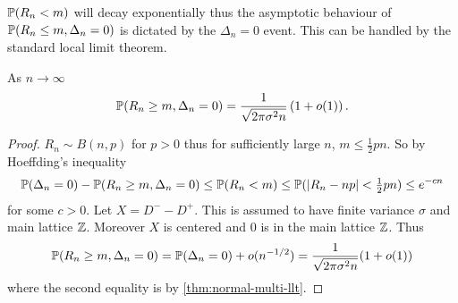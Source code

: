 $\P(R_n < m)$ will decay exponentially thus the asymptotic behaviour of $\P(R_n \leq m, \Delta_n = 0)$ is dictated by the $\Delta_n = 0$ event. This can be handled by the standard local limit theorem.
\begin{lemma}
    \label{lem:normal-llt}
    As $n \to \infty$
    \begin{equation*}
        \P(R_n \geq m, \Delta_n = 0) = \frac{1}{\sqrt{2 \pi \sigma^2 n}} \left( 1 + \littleo(1) \right).
    \end{equation*}
\end{lemma}
\begin{proof}
    $R_n \sim B(n, p)$ for $p > 0$ thus for sufficiently large $n$, $m \leq \frac{1}{2} pn$. So by Hoeffding's inequality
    \begin{equation*}
        \P(\Delta_n = 0) - \P(R_n \geq m, \Delta_n = 0) \leq \P(R_n < m) \leq \P(\abs{R_n - np} < \tfrac{1}{2}pn) \leq e^{-cn}
    \end{equation*}
    for some $c > 0$.  Let $X = D^- - D^+$. This is assumed to have finite variance $\sigma$ and main lattice $\Z$. Moreover $X$ is centered and $0$ is in the main lattice $\Z$. Thus
    \begin{equation*}
        \P(R_n \geq m, \Delta_n = 0) = \P(\Delta_n = 0) + \littleo(n^{-1/2}) = \frac{1}{\sqrt{2 \pi \sigma^2 n}}(1 + \littleo(1))
    \end{equation*}
    where the second equality is by \cref{thm:normal-multi-llt}.
\end{proof}

